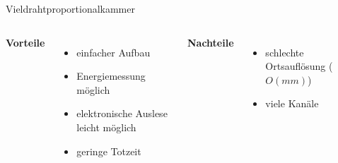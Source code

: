 \begin{frame}{Vieldrahtproportionalkammer}
    \begin{columns}[T]
			\textbf{Vorteile}	
			\vspace{0.7cm}	
			\begin{itemize}
				\item einfacher Aufbau
			  	\item Energiemessung möglich
			  	\item elektronische Auslese leicht möglich
			  	\item geringe Totzeit 
			\end{itemize}	
	    	\textbf{Nachteile}
	    	\vspace{0.7cm}
	    	\begin{itemize}
			  \item schlechte Ortsauflösung ($O(mm)$)
			  \item viele Kanäle
			\end{itemize}
    \end{columns}
    \vspace{1cm}
\end{frame}
% 
